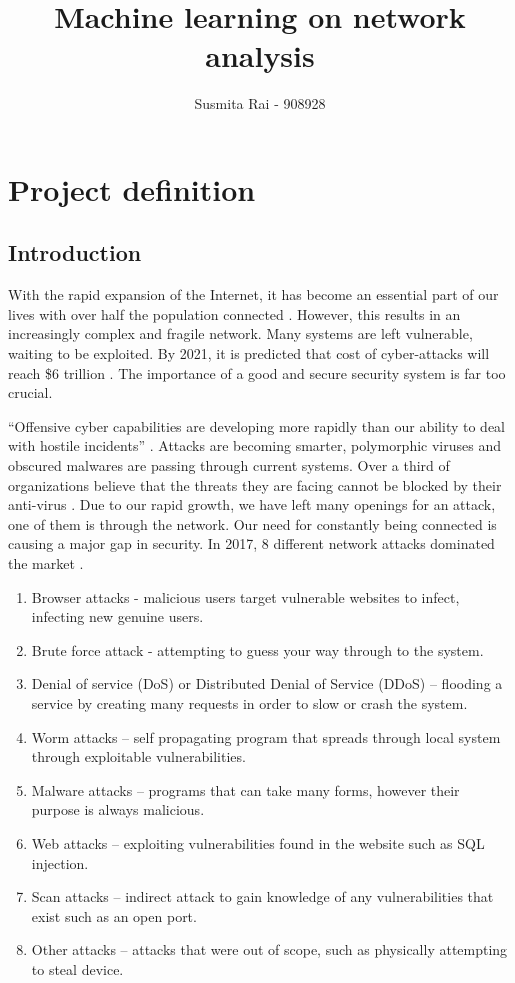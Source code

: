 \documentclass[11pt]{article}
\begin{document}
\title{Machine learning on network analysis}
\author{Susmita Rai - 908928}
\date{}
\maketitle

\newpage
{}
\tableofcontents
\newpage

\setlength{\parskip}{1em}

\section{Project definition}
\subsection{Introduction}
With the rapid expansion of the Internet, it has become an essential part of our lives with over half the population connected \cite{wearesocial}. However, this results in an increasingly complex and fragile network. Many systems are left vulnerable, waiting to be exploited. By 2021, it is predicted that cost of cyber-attacks will reach \$6 trillion \cite{varonis}. The importance of a good and secure security system is far too crucial.

“Offensive cyber capabilities are developing more rapidly than our ability to deal with hostile incidents” \cite{globalrisks}. Attacks are becoming smarter, polymorphic viruses and obscured malwares are passing through current systems. Over a third of organizations believe that the threats they are facing cannot be blocked by their anti-virus \cite{varonis}. 
Due to our rapid growth, we have left many openings for an attack, one of them is through the network. Our need for constantly being connected is causing a major gap in security. In 2017, 8 different network attacks dominated the market \cite{network-attack-types}.

\begin{enumerate}
  \item Browser attacks - malicious users target vulnerable websites to infect, infecting new genuine users. 
  \item Brute force attack - attempting to guess your way through to the system. 
  \item Denial of service (DoS) or Distributed Denial of Service (DDoS) – flooding a service by creating many requests in order to slow or crash the system.
  \item Worm attacks – self propagating program that spreads through local system through exploitable vulnerabilities.
  \item Malware attacks – programs that can take many forms, however their purpose is always malicious.
  \item Web attacks – exploiting vulnerabilities found in the website such as SQL injection.
  \item Scan attacks – indirect attack to gain knowledge of any vulnerabilities that exist such as an open port. 
  \item Other attacks – attacks that were out of scope, such as physically attempting to steal device.
\end{enumerate}
\end{document}
